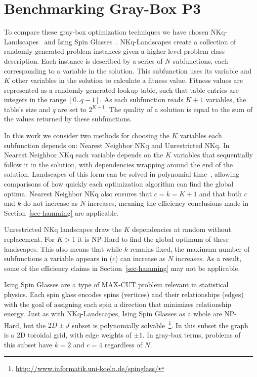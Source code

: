 \chapter{Benchmarking Gray-Box P3}
\label{chapter-gray-box-benchmarking}
To compare these gray-box optimization techniques we have chosen
NKq-Landscapes~\cite{chicano:2014:ball} and Ising Spin Glasses~\cite{saul:1994:spinglass}. NKq-Landscapes create
a collection of randomly generated problem instances given a
higher level problem class description. Each instance is described
by a series of $N$ subfunctions, each corresponding to a variable
in the solution. This subfunction uses its variable and $K$ other
variables in the solution to calculate a fitness value. Fitness values
are represented as a randomly generated lookup table, such that table
entries are integers in the range $[0..q-1]$. As each subfunction reads
$K+1$ variables, the table's size and $q$ are set to $2^{K+1}$. The quality
of a solution is equal to the sum of the values returned by these subfunctions.

In this work we consider two methods for choosing the $K$ variables
each subfunction depends on: Nearest Neighbor NKq and Unrestricted NKq.
In Nearest Neighbor NKq each variable depends on the $K$ variables that sequentially follow
it in the solution, with dependencies wrapping around the end of the solution.
Landscapes of this form can be solved in polynomial
time~\cite{wright:2000:solvingnk}, allowing comparisons of how quickly each optimization
algorithm can find the global optima. Nearest Neighbor NKq also ensures that $c=k=K+1$
and that both $c$ and $k$ do not increase as $N$ increases, meaning the efficiency
conclusions made in Section~\ref{sec-hamming} are applicable.

Unrestricted NKq landscapes draw the $K$ dependencies at random without replacement. For $K > 1$ it is
NP-Hard to find the global optimum of these landscapes. This also means that while
$k$ remains fixed, the maximum number of subfunctions a variable appears in ($c$) can increase
as $N$ increases. As a result,
some of the efficiency claims in Section~\ref{sec-hamming}
may not be applicable.

Ising Spin Glasses are a type of MAX-CUT problem relevant in statistical physics. Each spin glass
encodes spins (vertices) and their relationships (edges) with the goal of assigning each spin a direction
that minimizes relationship energy. Just as with NKq-Landscapes, Ising Spin Glasses as a whole
are NP-Hard, but the $2D\pm J$ subset is polynomially solvable~\cite{saul:1994:spinglass}\footnote{\url{http://www.informatik.uni-koeln.de/spinglass/}}. In this
subset the graph is a 2D toroidal grid, with edge weights of $\pm 1$. In gray-box terms,
problems of this subset have $k=2$ and $c=4$ regardless of $N$.

